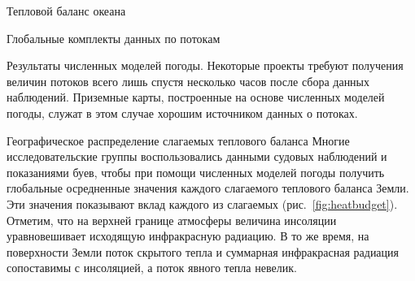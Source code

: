 \begin{chapter}{Тепловой баланс океана}
\begin{section}{Глобальные комплекты данных по потокам}
\begin{paragraph}{Результаты численных моделей погоды.}
Некоторые проекты требуют получения величин потоков всего лишь спустя несколько 
часов после сбора данных наблюдений. Приземные карты, построенные на основе
численных моделей погоды, служат в этом случае хорошим источником данных
о потоках.
%
\end{paragraph}
\end{section}

\begin{section}{Географическое распределение слагаемых теплового баланса}
Многие исследовательские группы воспользовались данными судовых наблюдений
и показаниями буев, чтобы при помощи численных моделей погоды получить 
глобальные осредненные значения каждого слагаемого теплового баланса Земли.
Эти значения показывают вклад каждого из слагаемых (рис.~\ref{fig:heatbudget}). 
Отметим, что на верхней границе атмосферы величина инсоляции уравновешивает 
исходящую инфракрасную радиацию. В то же время, на поверхности Земли 
поток скрытого тепла и суммарная инфракрасная радиация сопоставимы 
с инсоляцией, а поток явного тепла невелик.
%


\end{section}
\end{chapter}
